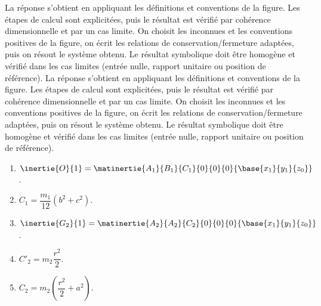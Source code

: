 \begin{corrigebox}
La réponse s'obtient en appliquant les définitions et conventions de la
    figure. Les étapes de calcul sont explicitées, puis le résultat est vérifié par
    cohérence dimensionnelle et par un cas limite.
On choisit les inconnues et les conventions positives de la figure,
        on écrit les relations de conservation/fermeture adaptées, puis on résout le
        système obtenu. Le résultat symbolique doit être homogène et vérifié dans les cas
        limites (entrée nulle, rapport unitaire ou position de référence).
La réponse s'obtient en appliquant les définitions et conventions de la
    figure. Les étapes de calcul sont explicitées, puis le résultat est vérifié par
    cohérence dimensionnelle et par un cas limite.
On choisit les inconnues et les conventions positives de la figure,
        on écrit les relations de conservation/fermeture adaptées, puis on résout le
        système obtenu. Le résultat symbolique doit être homogène et vérifié dans les cas
        limites (entrée nulle, rapport unitaire ou position de référence).
\begin{enumerate}
\item $\inertie{O}{1}=\matinertie{A_1}{B_1}{C_1}{0}{0}{0}{\base{x_1}{y_1}{z_0}}$.
\item $C_1 = \dfrac{m_1}{12}\left(b^2+c^2\right)$.
\item $\inertie{G_2}{1}=\matinertie{A_2}{A_2}{C_2}{0}{0}{0}{\base{x_1}{y_1}{z_0}}$.
\item $C'_2 =m_2\dfrac{r^2}{2}$.
\item $C_2 = m_2 \left(\dfrac{r^2}{2} +a^2 \right)$.
\end{enumerate}
\end{corrigebox}
